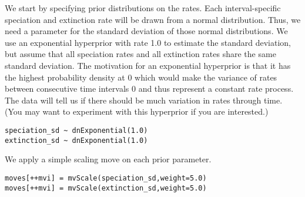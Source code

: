 We start by specifying prior distributions on the rates.
Each interval-specific speciation and extinction rate will be drawn from a normal distribution.
Thus, we need a parameter for the standard deviation of those normal distributions.
We use an exponential hyperprior with rate 1.0 to estimate the standard deviation, but assume that all speciation rates and all extinction rates share the same standard deviation.
The motivation for an exponential hyperprior is that it has the highest probability density at 0 which would make the variance of rates between consecutive time intervals 0 and thus represent a constant rate process.
The data will tell us if there should be much variation in rates through time.
(You may want to experiment with this hyperprior if you are interested.)
{\tt \begin{snugshade*}
\begin{lstlisting}
speciation_sd ~ dnExponential(1.0)
extinction_sd ~ dnExponential(1.0)
\end{lstlisting}
\end{snugshade*}}
We apply a simple scaling move on each prior parameter.
{\tt \begin{snugshade*}
\begin{lstlisting}
moves[++mvi] = mvScale(speciation_sd,weight=5.0)
moves[++mvi] = mvScale(extinction_sd,weight=5.0)
\end{lstlisting}
\end{snugshade*}}


